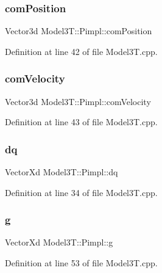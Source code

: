 \subsubsection{\texorpdfstring{com\+Position}{comPosition}}
{\footnotesize\ttfamily Vector3d Model3\+T\+::\+Pimpl\+::com\+Position}



Definition at line 42 of file Model3\+T.\+cpp.

\hypertarget{structModel3T_1_1Pimpl_a80c7336da4224ba5105c067870e818bb}{}\label{structModel3T_1_1Pimpl_a80c7336da4224ba5105c067870e818bb} 
\subsubsection{\texorpdfstring{com\+Velocity}{comVelocity}}
{\footnotesize\ttfamily Vector3d Model3\+T\+::\+Pimpl\+::com\+Velocity}



Definition at line 43 of file Model3\+T.\+cpp.

\hypertarget{structModel3T_1_1Pimpl_a38a7e4a5908517ee2bd63c75eb570f63}{}\label{structModel3T_1_1Pimpl_a38a7e4a5908517ee2bd63c75eb570f63} 
\subsubsection{\texorpdfstring{dq}{dq}}
{\footnotesize\ttfamily Vector\+Xd Model3\+T\+::\+Pimpl\+::dq}



Definition at line 34 of file Model3\+T.\+cpp.

\hypertarget{structModel3T_1_1Pimpl_a8a6bd5458703a775e213e47794a59d7d}{}\label{structModel3T_1_1Pimpl_a8a6bd5458703a775e213e47794a59d7d} 
\subsubsection{\texorpdfstring{g}{g}}
{\footnotesize\ttfamily Vector\+Xd Model3\+T\+::\+Pimpl\+::g}



Definition at line 53 of file Model3\+T.\+cpp.

